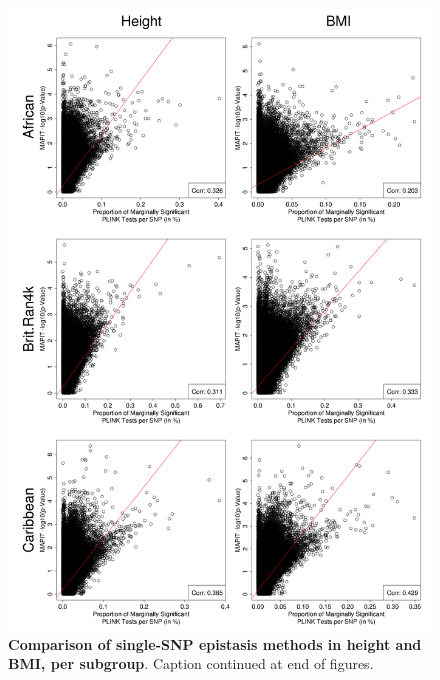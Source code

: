 \documentclass[12pt,a4paper]{article}
\begin{document}
\setlength{\footskip}{3cm}
\begin{figure}[htbp]
\centering
\vspace*{-2cm}
\includegraphics[scale=.3]{Images/Supp/InterPath_Supp_Figure_PLINKvsMAPIT_vs3_AllPops_HeightBMI_pt1.png}
\caption[TBD]{\textbf{Comparison of single-SNP epistasis methods in height and BMI, per subgroup}. Caption continued at end of figures.}
\label{InterPath-Supp-Figure-MAPITvsPLINK-HeightBMI-AllPops-a}
\end{figure}
\clearpage
\setlength{\footskip}{1cm}
\addtocounter{figure}{-1}
\end{document}
